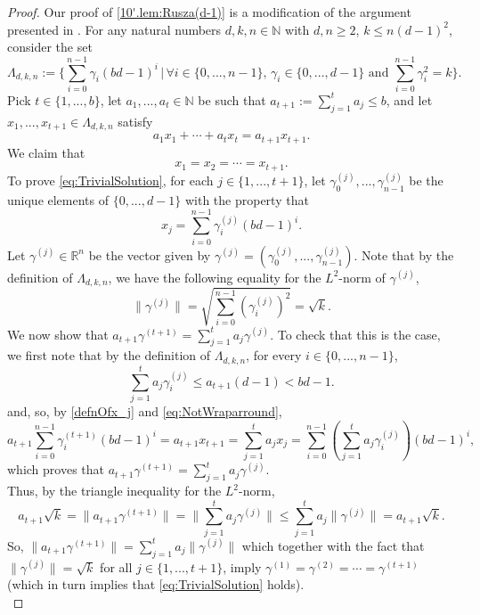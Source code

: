 \documentclass[11pt,american,preprint]{elsarticle}
\numberwithin{equation}{section}
\theoremstyle{plain}
\theoremstyle{plain*}
\theoremstyle{plain}
\theoremstyle{plain*}
\theoremstyle{plain}
\theoremstyle{plain*}
\theoremstyle{remark}
\theoremstyle{remark*}
\theoremstyle{remark}
\theoremstyle{remark*}
\theoremstyle{remark}
\theoremstyle{remark*}
\theoremstyle{plain}
\theoremstyle{definition}
\theoremstyle{plain}
\theoremstyle{plain} %
\newcommand{\R}{\mathbb{R}}
\newcommand{\N}{\mathbb{N}}
\begin{document}
\begin{proof}
    Our proof of \cref{10'.lem:Rusza(d-1)} is a modification of the argument presented in \cite{BehrendSetsWithNo3-APs}. For any natural numbers $d,k,n\in\N$ with $d,n\geq 2$, $k\leq n(d-1)^2$, consider the set 
    $$
\Lambda_{d,k,n}:=\{\sum_{i=0}^{n-1} \gamma_i( b d-1)^i\,|\,\forall i\in\{0,...,n-1\},\,\gamma_i\in\{0,...,d-1\}\text{ and }\sum_{i=0}^{n-1}\gamma_i^2=k\}.
    $$
Pick $t\in\{1,...,b\}$,  let $a_1,...,a_t\in\N$ be such that $a_{t+1}:=\sum_{j=1}^ta_j
\leq b$, and let   $x_1,...,x_{t+1}\in\Lambda_{d,k,n}$ satisfy 
$$a_1x_1+\cdots+a_tx_t=a_{t+1}x_{t+1}.$$
We claim that  
\begin{equation}\label{eq:TrivialSolution}
x_1=x_2=\cdots=x_{t+1}.
\end{equation}
To prove \eqref{eq:TrivialSolution}, for each $j\in \{1,...,t+1\}$, let $\gamma^{(j)}_0,...,\gamma^{(j)}_{n-1}$ be the unique elements of $\{0,...,d-1\}$ with the property that 
\begin{equation}\label{defnOfx_j}
x_j=\sum_{i=0}^{n-1}\gamma_i^{(j)}(bd-1)^i.
\end{equation}
Let $\gamma^{(j)}\in \R^n$ be the vector given by $\gamma^{(j)}=(\gamma^{(j)}_0,...,\gamma^{(j)}_{n-1})$. Note that by the definition of $\Lambda_{d,k,n}$, we have the following equality for the $L^2$-norm of $\gamma^{(j)}$,
$$\|\gamma^{(j)}\|=\sqrt{\sum_{i=0}^{n-1}(\gamma^{(j)}_i)^2}=\sqrt k.$$ 
We now show that $a_{t+1}\gamma^{(t+1)}=\sum_{j=1}^ta_j\gamma^{(j)}$.  To check that this is the case, we first note that by the definition of $\Lambda_{d,k,n}$, for every $i\in\{0,...,n-1\}$,
\begin{equation}\label{eq:NotWraparround}
\sum_{j=1}^ta_j \gamma^{(j)}_i\leq a_{t+1}(d-1)<bd-1.
\end{equation}
and, so, by \eqref{defnOfx_j} and \eqref{eq:NotWraparround}, 
$$
a_{t+1}\sum_{i=0}^{n-1}\gamma_i^{(t+1)}(bd-1)^i=a_{t+1}x_{t+1}=\sum_{j=1}^ta_jx_j= \sum_{i=0}^{n-1}\left(\sum_{j=1}^ta_j \gamma^{(j)}_i\right)(bd-1)^i,
$$
which proves that $a_{t+1}\gamma^{(t+1)}=\sum_{j=1}^ta_j\gamma^{(j)}$.\\
Thus, by the triangle inequality for the $L^2$-norm,
$$a_{t+1}\sqrt{k}=\|a_{t+1}\gamma^{(t+1)}\|= 
\|\sum_{j=1}^ta_j\gamma^{(j)}\|\leq \sum_{j=1}^ta_j\|\gamma^{(j)}\|=a_{t+1}\sqrt k.$$
So, $\|a_{t+1}\gamma^{(t+1)}\|= \sum_{j=1}^ta_j\|\gamma^{(j)}\|$ which together with the fact that 
 $\|\gamma^{(j)}\|=\sqrt k$ for all $j\in\{1,...,t+1\}$, imply $\gamma^{(1)}=\gamma^{(2)}=\cdots=\gamma^{(t+1)}$ (which in turn implies that \eqref{eq:TrivialSolution} holds).\\

\end{proof}
\end{document}
